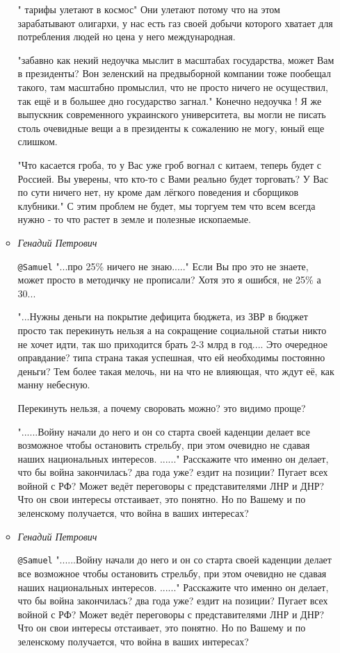 \begin{itemize}
\begin{itemize}
" тарифы улетают в космос" Они улетают потому что на этом зарабатывают
олигархи, у нас есть газ своей добычи которого хватает для потребления людей но
цена у него международная.

"забавно как некий недоучка мыслит в масштабах государства, может Вам в
президенты? Вон зеленский на предвыборной компании тоже пообещал такого, там
масштабно промыслил, что не просто ничего не осуществил, так ещё и в большее
дно государство загнал." Конечно недоучка ! Я же выпускник современного
украинского университета, вы могли не писать столь очевидные вещи а в
президенты к сожалению не могу, юный еще слишком.

"Что касается гроба, то у Вас уже гроб вогнал с китаем, теперь будет с Россией.
Вы уверены, что кто-то с Вами реально будет торговать? У Вас по сути ничего
нет, ну кроме дам лёгкого поведения и сборщиков клубники." С этим проблем не
будет, мы торгуем тем что всем всегда нужно - то что растет в земле и полезные
ископаемые.

\item \emph{Генадий Петрович}

\verb|@Samuel|  "...про 25\% ничего не знаю....." Если Вы про это не знаете,
может просто в методичку не прописали? Хотя это я ошибся, не 25\% а 30...

"...Нужны деньги на покрытие дефицита бюджета, из ЗВР в бюджет просто так
перекинуть нельзя а на сокращение социальной статьи никто не хочет идти, так шо
приходится брать 2-3 млрд в год.... Это очередное оправдание? типа страна такая
успешная, что ей необходимы постоянно деньги? Тем более такая мелочь, ни на что
не влияющая, что ждут её, как манну небесную.

Перекинуть нельзя, а почему своровать можно? это видимо проще?

"......Войну начали до него и он со старта своей каденции делает все возможное
чтобы остановить стрельбу, при этом очевидно не сдавая наших национальных
интересов. ......" Расскажите что именно он делает, что бы война закончилась?
два года уже? ездит на позиции? Пугает всех войной с РФ? Может ведёт переговоры
с представителями ЛНР и ДНР?  Что он свои интересы отстаивает, это понятно. Но
по Вашему и по зеленскому получается, что война в ваших интересах?

\item \emph{Генадий Петрович}

\verb|@Samuel|  "......Войну начали до него и он со старта своей каденции
делает все возможное чтобы остановить стрельбу, при этом очевидно не сдавая
наших национальных интересов. ......" Расскажите что именно он делает, что бы
война закончилась? два года уже? ездит на позиции? Пугает всех войной с РФ?
Может ведёт переговоры с представителями ЛНР и ДНР?  Что он свои интересы
отстаивает, это понятно. Но по Вашему и по зеленскому получается, что война в
ваших интересах?



\end{itemize}
\end{itemize}
